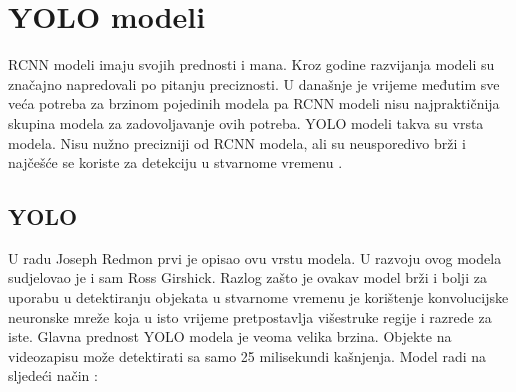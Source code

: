 \section{YOLO modeli}
RCNN modeli imaju svojih prednosti i mana. Kroz godine razvijanja modeli su značajno napredovali po pitanju preciznosti. 
U današnje je vrijeme međutim sve veća potreba za brzinom 
pojedinih modela pa RCNN modeli nisu najpraktičnija skupina modela za zadovoljavanje ovih potreba.\newline
YOLO  modeli takva su vrsta modela. Nisu nužno precizniji od RCNN modela, ali su neusporedivo
brži i najčešće se koriste za detekciju u stvarnome vremenu . 


\subsection{YOLO}
U radu \citep{DBLP:journals/corr/RedmonDGF15} Joseph Redmon prvi je opisao ovu vrstu modela.\newline
U razvoju ovog modela sudjelovao je i sam Ross Girshick. 
Razlog zašto je ovakav model brži i bolji za uporabu u detektiranju objekata u stvarnome vremenu je korištenje konvolucijske neuronske
mreže koja u isto vrijeme pretpostavlja višestruke regije i razrede za iste. Glavna prednost YOLO modela je veoma velika brzina. Objekte na videozapisu može detektirati sa samo 25 milisekundi kašnjenja.\newline
Model radi na sljedeći način \citep{DBLP:journals/corr/RedmonDGF15}:\newline
